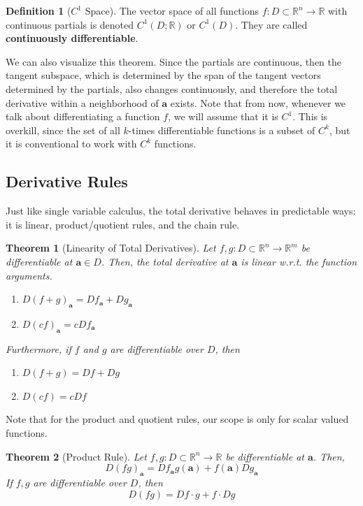 \documentclass{article}
\newtheorem{theorem}{Theorem}[section]
\theoremstyle{remark}
\theoremstyle{definition}
\newtheorem{definition}{Definition}[section]
\begin{document}
\begin{definition}[$C^1$ Space]
The vector space of all functions $f: D \subset \mathbb{R}^n \longrightarrow \mathbb{R}$ with continuous partials is denoted $C^1 (D; \mathbb{R})$ or $C^1 (D)$. They are called \textbf{continuously differentiable}. 
\end{definition}

We can also visualize this theorem. Since the partials are continuous, then the tangent subspace, which is determined by the span of the tangent vectors determined by the partials, also changes continuously, and therefore the total derivative within a neighborhood of $\mathbf{a}$ exists. Note that from now, whenever we talk about differentiating a function $f$, we will assume that it is $C^1$. This is overkill, since the set of all $k$-times differentiable functions is a subset of $C^k$, but it is conventional to work with $C^k$ functions.  

\subsection{Derivative Rules}
Just like single variable calculus, the total derivative behaves in predictable ways: it is linear, product/quotient rules, and the chain rule. 

\begin{theorem}[Linearity of Total Derivatives]
Let $f, g: D \subset \mathbb{R}^n \longrightarrow \mathbb{R}^m$ be differentiable at $\mathbf{a} \in D$. Then, the total derivative at $\mathbf{a}$ is linear w.r.t. the function arguments. 
\begin{enumerate}
    \item $D (f + g)_\mathbf{a} = D f_\mathbf{a} + D g_\mathbf{a}$ 
    \item $D (c f)_\mathbf{a} = c D f_\mathbf{a}$ 
\end{enumerate}
Furthermore, if $f$ and $g$ are differentiable over $D$, then 
\begin{enumerate}
    \item $D (f + g) = D f + D g$ 
    \item $D (c f) = c D f$
\end{enumerate}
\end{theorem}

Note that for the product and quotient rules, our scope is only for scalar valued functions. 

\begin{theorem}[Product Rule]
Let $f, g: D \subset \mathbb{R}^n \longrightarrow \mathbb{R}$ be differentiable at $\mathbf{a}$. Then, 
\[D (f g)_\mathbf{a} = D f_\mathbf{a} g(\mathbf{a}) + f(\mathbf{a}) D g_\mathbf{a}\]
If $f, g$ are differentiable over $D$, then 
\[D (f g) = D f \cdot g + f \cdot D g\]
\end{theorem}
\end{document}
